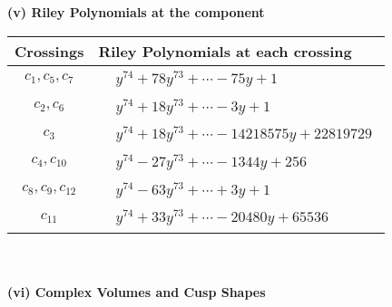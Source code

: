 \documentclass[1p]{elsarticle_modified}
\theoremstyle{definition}
\begin{document}
\newpage\renewcommand{\arraystretch}{1}
\flushleft \textbf{(v) Riley Polynomials at the component}\newline \\
\begin{tabular}{m{50pt}|m{274pt}}
Crossings & \hspace{64pt}Riley Polynomials at each crossing \\
\hline $$\begin{aligned}c_{1},c_{5},c_{7}\end{aligned}$$&$\begin{aligned}
&y^{74}+78 y^{73}+\cdots-75 y+1
\end{aligned}$\\
\hline $$\begin{aligned}c_{2},c_{6}\end{aligned}$$&$\begin{aligned}
&y^{74}+18 y^{73}+\cdots-3 y+1
\end{aligned}$\\
\hline $$\begin{aligned}c_{3}\end{aligned}$$&$\begin{aligned}
&y^{74}+18 y^{73}+\cdots-14218575 y+22819729
\end{aligned}$\\
\hline $$\begin{aligned}c_{4},c_{10}\end{aligned}$$&$\begin{aligned}
&y^{74}-27 y^{73}+\cdots-1344 y+256
\end{aligned}$\\
\hline $$\begin{aligned}c_{8},c_{9},c_{12}\end{aligned}$$&$\begin{aligned}
&y^{74}-63 y^{73}+\cdots+3 y+1
\end{aligned}$\\
\hline $$\begin{aligned}c_{11}\end{aligned}$$&$\begin{aligned}
&y^{74}+33 y^{73}+\cdots-20480 y+65536
\end{aligned}$\\
\hline
\end{tabular}\\~\\
\newpage\flushleft \textbf{(vi) Complex Volumes and Cusp Shapes}
\end{document}
